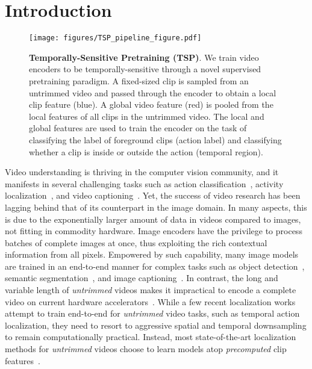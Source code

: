 \documentclass[10pt,twocolumn,letterpaper]{article}
\begin{document}
 \section{Introduction}\label{sec:introduction}

\begin{figure}[t!]
    \centering
    \texttt{[image: figures/TSP\_pipeline\_figure.pdf]}
    \vspace{-15pt}
    \caption{\textbf{Temporally-Sensitive Pretraining (TSP)}. 
    We train video encoders to be temporally-sensitive through a novel supervised pretraining paradigm. A fixed-sized clip is sampled from an untrimmed video and passed through the encoder to obtain a local clip feature (blue). A global video feature (red) is pooled from the local features of all clips in the untrimmed video. The local and global features are used to train the encoder on the task of classifying the label of foreground clips (action label) and classifying whether a clip is inside or outside the action (temporal region).}
    \vspace{-3pt}
    \label{fig:pipeline}
\end{figure}


Video understanding is thriving in the computer vision community, and it manifests in several challenging tasks such as action classification~\cite{Feichtenhofer_2019_ICCV,Korbar_2019_ICCV,Lin_2019_ICCV_TSM,Tran_2019_ICCV}, activity localization~\cite{gao_eccv_2018,kumar2017hide,zhao2020bottom}, and video captioning~\cite{Hou_2019_ICCV,Pan_2020_CVPR_Spatio,Wang_2019_ICCV,Zheng_2020_CVPR_syntax}. Yet, the success of video research has been lagging behind that of its counterpart in the image domain. In many aspects, this is due to the exponentially larger amount of data in videos compared to images, not fitting in commodity hardware. Image encoders have the privilege to process batches of complete images at once, thus exploiting the rich contextual information from all pixels. Empowered by such capability, many image models are trained in an end-to-end manner for complex tasks such as object detection~\cite{redmon2016you,ren2015faster,tan2020efficientdet}, semantic segmentation~\cite{chen2018encoder,he2017mask,howard2019searching}, and image captioning~\cite{anderson2018bottom,you2016image,lu2017knowing}. In contrast, the long and variable length of \emph{untrimmed} videos makes it impractical to encode a complete video on current hardware accelerators~\cite{wu2019long}. 
While a few recent localization works~\cite{liu2020progressive,zhao_iccv_2017} attempt to train end-to-end for \emph{untrimmed} video tasks, such as temporal action localization, they need to resort to aggressive spatial and temporal downsampling to remain computationally practical.
Instead, most state-of-the-art localization methods for \emph{untrimmed} videos choose to learn models atop \emph{precomputed} clip features~\cite{bmt,Lin_2019_ICCV,xu2020gtad,Zeng_2019_ICCV}. 
\end{document}

